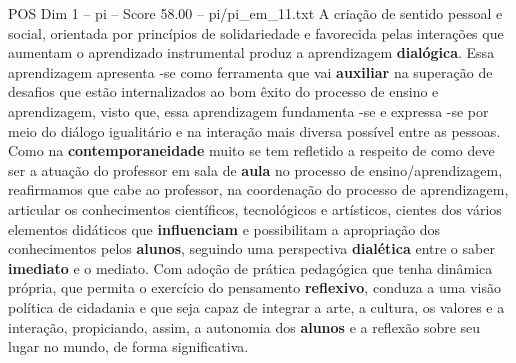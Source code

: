 \begin{textsample}{POS Dim 1 – pi – Score 58.00 – pi/pi\_em\_11.txt}
A criação de sentido pessoal e social, orientada por princípios de solidariedade e favorecida pelas interações que aumentam o aprendizado instrumental produz a aprendizagem \textbf{dialógica}.
Essa aprendizagem apresenta -se como ferramenta que vai \textbf{auxiliar} na superação de desafios que estão internalizados ao bom êxito do processo de ensino e aprendizagem, visto que, essa aprendizagem fundamenta -se e expressa -se por meio do diálogo igualitário e na interação mais diversa possível entre as pessoas.
Como na \textbf{contemporaneidade} muito se tem refletido a respeito de como deve ser a atuação do professor em sala de \textbf{aula} no processo de ensino/aprendizagem, reafirmamos que cabe ao professor, na coordenação do processo de aprendizagem, articular os conhecimentos científicos, tecnológicos e artísticos, cientes dos vários elementos didáticos que \textbf{influenciam} e possibilitam a apropriação dos conhecimentos pelos \textbf{alunos}, seguindo uma perspectiva \textbf{dialética} entre o saber \textbf{imediato} e o mediato.
Com adoção de prática pedagógica que tenha dinâmica própria, que permita o exercício do pensamento \textbf{reflexivo}, conduza a uma visão política de cidadania e que seja capaz de integrar a arte, a cultura, os valores e a interação, propiciando, assim, a autonomia dos \textbf{alunos} e a reflexão sobre seu lugar no mundo, de forma significativa.

\end{textsample}
